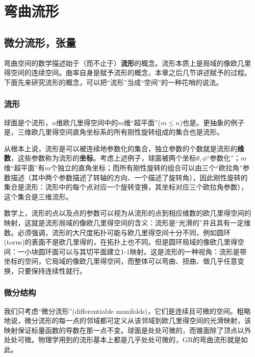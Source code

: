 \chapter{弯曲流形}
\label{chap6}

\section{微分流形，张量}
\label{sec6.1}
弯曲空间的数学描述始于（而不止于）\textbf{流形}的概念。流形本质上是局域的像欧几里得空间的连续空间。曲率自身是赋予流形的概念，本章之后几节讲述赋予的过程。下面先来研究流形的概念，可以把“流形”当成“空间”的一种花哨的说法。

\subsection*{流形}
球面是个流形，$n$维欧几里得空间中的$m$维“超平面”($m \le n$)也是。更抽象的例子是，三维欧几里得空间直角坐标系的所有刚性旋转组成的集合也是流形。

从根本上说，流形是可以被连续地参数化的集合，独立参数的个数就是流形的\textbf{维数}，这些参数称为流形的\textbf{坐标}。考虑上述例子，球面被两个坐标$\theta, \phi$“参数化”；$m$维“超平面”有$m$个独立的直角坐标；而所有刚性旋转的组合可以由三个“欧拉角”参数描述（其中两个参数描述了转轴的方向、一个描述了旋转角），因此刚性旋转的集合是流形：流形中的每个点对应一个旋转变换，其坐标对应三个欧拉角参数），这个集合是三维流形。

数学上，流形的点以及点的参数可以视为从流形的点到相应维数的欧几里得空间的映射，这就是流形局域的像欧几里得空间的含义：流形是“光滑的”并且具有一定维数。必须强调，流形的大尺度拓扑可能与欧几里得空间十分不同，例如圆环(torus)的表面不是欧几里得的，在拓扑上也不同。但是圆环局域的像欧几里得空间：一小块圆环面可以与其切平面建立1-1映射。这是流形的一种视角：流形是带坐标的空间，它局域的像欧几里得空间，而整体可以弯曲、扭曲、做几乎任意变换，只要保持连续性就行。


\subsection*{微分结构}
我们只考虑“微分流形”(differentiable manifolds)，它们是连续且可微的空间。粗略地说，微分流形的每一点的邻域都可定义从该邻域到欧几里得空间的光滑映射，该映射保证标量函数的导数在那一点不变。球面是处处可微的，而锥面除了顶点以外处处可微。物理学用到的流形基本上都是几乎处处可微的，GR的弯曲流形就是如此。

